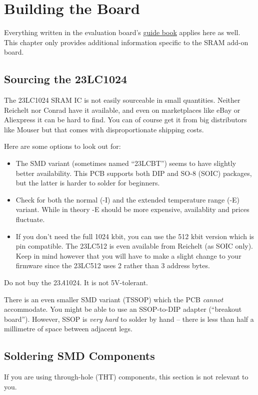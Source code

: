 \documentclass{article}
\newenvironment{note}{\begin{tcolorbox}[colback=blue!5!white,colframe=blue!75!black,title=\textbf{Note}]}{\end{tcolorbox}}
\newenvironment{caution}{\begin{tcolorbox}[colback=red!5!white,colframe=red!75!black,title=\textbf{Caution}]}{\end{tcolorbox}}
\begin{document}
\section{Building the Board}
Everything written in the evaluation board's \href{https://github.com/7vgn/EvaBoard/Guide/EvaBoardGuide.pdf}{guide book} applies here as well. This chapter only provides additional information specific to the SRAM add-on board. 

\subsection{Sourcing the 23LC1024}
The 23LC1024 SRAM IC is not easily sourceable in small quantities. Neither Reichelt nor Conrad have it available, and even on marketplaces like eBay or Aliexpress it can be hard to find. You can of course get it from big distributors like Mouser but that comes with disproportionate shipping costs.

Here are some options to look out for:
\begin{itemize}
\item The SMD variant (sometimes named “23LCBT”) seems to have slightly better availability. This PCB supports both DIP and SO-8 (SOIC) packages, but the latter is harder to solder for beginners. 
\item Check for both the normal (-I) and the extended temperature range (-E) variant. While in theory -E should be more expensive, availablity and prices fluctuate.
\item If you don’t need the full 1024 kbit, you can use the 512 kbit version which is pin compatible. The 23LC512 is even available from Reichelt (as SOIC only).
Keep in mind however that you will have to make a slight change to your firmware since the 23LC512 uses 2 rather than 3 address bytes.
\end{itemize}

\begin{caution}
Do not buy the 23\emph{A}1024. It is not 5V-tolerant. 
\end{caution}

\begin{note}
There is an even smaller SMD variant (TSSOP) which the PCB \emph{cannot} accommodate. You might be able to use an SSOP-to-DIP adapter (``breakout board''). However, SSOP is \emph{very hard} to solder by hand -- there is less than half a millimetre of space between adjacent legs. 
\end{note}

\subsection{Soldering SMD Components}
\begin{note}
If you are using through-hole (THT) components, this section is not relevant to you. 
\end{note}
\end{document}

